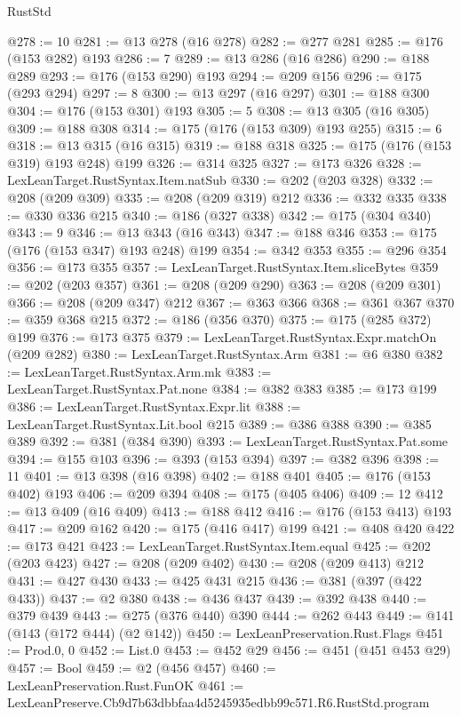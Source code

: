 \begin{lexlean}{RustStd}
\begin{coremodule}
@278 := 10
@281 := @13 @278 (@16 @278)
@282 := @277 @281
@285 := @176 (@153 @282) @193
@286 := 7
@289 := @13 @286 (@16 @286)
@290 := @188 @289
@293 := @176 (@153 @290) @193
@294 := @209 @156
@296 := @175 (@293 @294)
@297 := 8
@300 := @13 @297 (@16 @297)
@301 := @188 @300
@304 := @176 (@153 @301) @193
@305 := 5
@308 := @13 @305 (@16 @305)
@309 := @188 @308
@314 := @175 (@176 (@153 @309) @193 @255)
@315 := 6
@318 := @13 @315 (@16 @315)
@319 := @188 @318
@325 := @175 (@176 (@153 @319) @193 @248) @199
@326 := @314 @325
@327 := @173 @326
@328 := LexLeanTarget.RustSyntax.Item.natSub
@330 := @202 (@203 @328)
@332 := @208 (@209 @309)
@335 := @208 (@209 @319) @212
@336 := @332 @335
@338 := @330 @336 @215
@340 := @186 (@327 @338)
@342 := @175 (@304 @340)
@343 := 9
@346 := @13 @343 (@16 @343)
@347 := @188 @346
@353 := @175 (@176 (@153 @347) @193 @248) @199
@354 := @342 @353
@355 := @296 @354
@356 := @173 @355
@357 := LexLeanTarget.RustSyntax.Item.sliceBytes
@359 := @202 (@203 @357)
@361 := @208 (@209 @290)
@363 := @208 (@209 @301)
@366 := @208 (@209 @347) @212
@367 := @363 @366
@368 := @361 @367
@370 := @359 @368 @215
@372 := @186 (@356 @370)
@375 := @175 (@285 @372) @199
@376 := @173 @375
@379 := LexLeanTarget.RustSyntax.Expr.matchOn (@209 @282)
@380 := LexLeanTarget.RustSyntax.Arm
@381 := @6 @380
@382 := LexLeanTarget.RustSyntax.Arm.mk
@383 := LexLeanTarget.RustSyntax.Pat.none
@384 := @382 @383
@385 := @173 @199
@386 := LexLeanTarget.RustSyntax.Expr.lit
@388 := LexLeanTarget.RustSyntax.Lit.bool @215
@389 := @386 @388
@390 := @385 @389
@392 := @381 (@384 @390)
@393 := LexLeanTarget.RustSyntax.Pat.some
@394 := @155 @103
@396 := @393 (@153 @394)
@397 := @382 @396
@398 := 11
@401 := @13 @398 (@16 @398)
@402 := @188 @401
@405 := @176 (@153 @402) @193
@406 := @209 @394
@408 := @175 (@405 @406)
@409 := 12
@412 := @13 @409 (@16 @409)
@413 := @188 @412
@416 := @176 (@153 @413) @193
@417 := @209 @162
@420 := @175 (@416 @417) @199
@421 := @408 @420
@422 := @173 @421
@423 := LexLeanTarget.RustSyntax.Item.equal
@425 := @202 (@203 @423)
@427 := @208 (@209 @402)
@430 := @208 (@209 @413) @212
@431 := @427 @430
@433 := @425 @431 @215
@436 := @381 (@397 (@422 @433))
@437 := @2 @380
@438 := @436 @437
@439 := @392 @438
@440 := @379 @439
@443 := @275 (@376 @440) @390
@444 := @262 @443
@449 := @141 (@143 (@172 @444) (@2 @142))
@450 := LexLeanPreservation.Rust.Flags
@451 := Prod.{0, 0}
@452 := List.{0}
@453 := @452 @29
@456 := @451 (@451 @453 @29)
@457 := Bool
@459 := @2 (@456 @457)
@460 := LexLeanPreservation.Rust.FunOK
@461 := LexLeanPreserve.Cb9d7b63dbbfaa4d5245935edbb99c571.R6.RustStd.program

\end{coremodule}
\end{lexlean}
